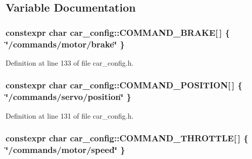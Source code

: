 \subsection{Variable Documentation}
\subsubsection[{\texorpdfstring{C\+O\+M\+M\+A\+N\+D\+\_\+\+B\+R\+A\+KE}{COMMAND_BRAKE}}]{\setlength{\rightskip}{0pt plus 5cm}constexpr char car\+\_\+config\+::\+C\+O\+M\+M\+A\+N\+D\+\_\+\+B\+R\+A\+KE\mbox{[}$\,$\mbox{]} \{ \char`\"{}/commands/motor/brake\char`\"{} \}}\hypertarget{namespacecar__config_ab3b957004ca9df19d509c984937723f7}{}\label{namespacecar__config_ab3b957004ca9df19d509c984937723f7}


Definition at line 133 of file car\+\_\+config.\+h.

\subsubsection[{\texorpdfstring{C\+O\+M\+M\+A\+N\+D\+\_\+\+P\+O\+S\+I\+T\+I\+ON}{COMMAND_POSITION}}]{\setlength{\rightskip}{0pt plus 5cm}constexpr char car\+\_\+config\+::\+C\+O\+M\+M\+A\+N\+D\+\_\+\+P\+O\+S\+I\+T\+I\+ON\mbox{[}$\,$\mbox{]} \{ \char`\"{}/commands/servo/position\char`\"{} \}}\hypertarget{namespacecar__config_a6008524bf1090f0ab0c994b2f80dcb22}{}\label{namespacecar__config_a6008524bf1090f0ab0c994b2f80dcb22}


Definition at line 131 of file car\+\_\+config.\+h.

\subsubsection[{\texorpdfstring{C\+O\+M\+M\+A\+N\+D\+\_\+\+T\+H\+R\+O\+T\+T\+LE}{COMMAND_THROTTLE}}]{\setlength{\rightskip}{0pt plus 5cm}constexpr char car\+\_\+config\+::\+C\+O\+M\+M\+A\+N\+D\+\_\+\+T\+H\+R\+O\+T\+T\+LE\mbox{[}$\,$\mbox{]} \{ \char`\"{}/commands/motor/speed\char`\"{} \}}\hypertarget{namespacecar__config_afdb192c52a9126c0bedf2ca4a7c99c2a}{}\label{namespacecar__config_afdb192c52a9126c0bedf2ca4a7c99c2a}


